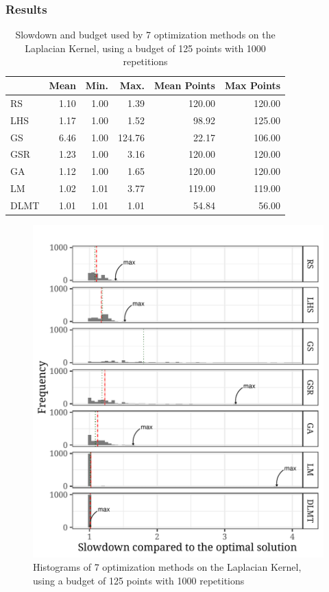 \documentclass[conference]{IEEEtran}
\begin{document}
\subsubsection{Results}
\label{sec:orgdf0334b}
\begin{table}[ht]
\centering
\caption{Slowdown and budget used by 7 optimization methods on the Laplacian Kernel, using a budget of 125 points with 1000 repetitions}
\begingroup\small
\begin{tabular}{lrrrrr}
  \toprule
 & Mean & Min. & Max. & Mean Points & Max Points \\
  \midrule
RS & 1.10 & 1.00 & 1.39 & 120.00 & 120.00 \\
  LHS & 1.17 & 1.00 & 1.52 & 98.92 & 125.00 \\
  GS & 6.46 & 1.00 & 124.76 & 22.17 & 106.00 \\
  GSR & 1.23 & 1.00 & 3.16 & 120.00 & 120.00 \\
  GA & 1.12 & 1.00 & 1.65 & 120.00 & 120.00 \\
  LM & 1.02 & 1.01 & 3.77 & 119.00 & 119.00 \\
  DLMT & 1.01 & 1.01 & 1.01 & 54.84 & 56.00 \\
   \bottomrule
\end{tabular}
\endgroup
\end{table}

\begin{center}
\begin{figure}[ht]
\centering
\includegraphics[width=.9\columnwidth]{./img/comparison_histogram.pdf}
\caption{Histograms of 7 optimization methods on the Laplacian Kernel, using a budget of 125 points with 1000 repetitions}
\end{figure}
\end{center}
\end{document}
